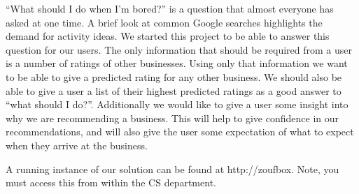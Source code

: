 ``What should I do when I'm bored?''  is a question that almost everyone has
asked at one time. A brief look at common Google searches highlights the demand
for activity ideas. We started this project to be able to answer this question
for our users. The only information that should be required from a user is 
a number of ratings of other businesses. Using only that information we want to
be able to give a predicted rating for any other business. We should also be
able to give a user a list of their highest predicted ratings as a good answer
to ``what should I do?''. Additionally we would like to give a user some insight
into why we are recommending a business. This will help to give confidence in
our recommendations, and will also give the user some expectation of what to
expect when they arrive at the business.

A running instance of our solution can be found at http://zoufbox.
Note, you must access this from within the CS department.
